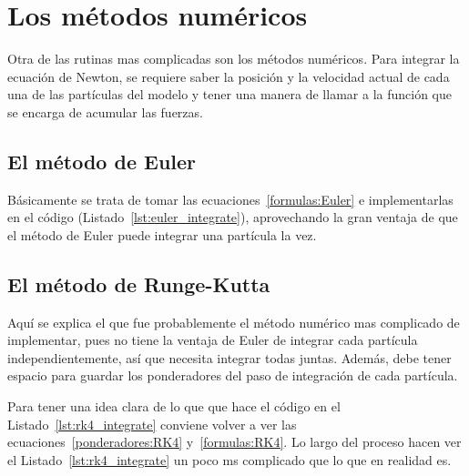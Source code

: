 
\section{Los métodos numéricos}
Otra de las rutinas mas complicadas son los métodos numéricos.
Para integrar la ecuación de Newton, se requiere saber la posición y la velocidad actual de cada una de las partículas del modelo y tener una manera de llamar a la función que se encarga de acumular las fuerzas.

\subsection{El método de Euler}
Básicamente se trata de tomar las ecuaciones~\ref{formulas:Euler} e implementarlas en el código (Listado~\ref{lst:euler_integrate}), aprovechando la gran ventaja de que el método de Euler puede integrar una partícula la vez.


\subsection{El método de Runge-Kutta}
Aquí se explica el que fue probablemente el método numérico mas complicado de implementar, pues no tiene la ventaja de Euler de integrar cada partícula independientemente, así que necesita integrar todas juntas.
Además, debe tener espacio para guardar los ponderadores del paso de integración de cada partícula.

Para tener una idea clara de lo que que hace el código en el Listado~\ref{lst:rk4_integrate} conviene volver a ver las ecuaciones~\ref{ponderadores:RK4} y~\ref{formulas:RK4}.
Lo largo del proceso hacen ver el Listado~\ref{lst:rk4_integrate} un poco ms complicado que lo que en realidad es.

